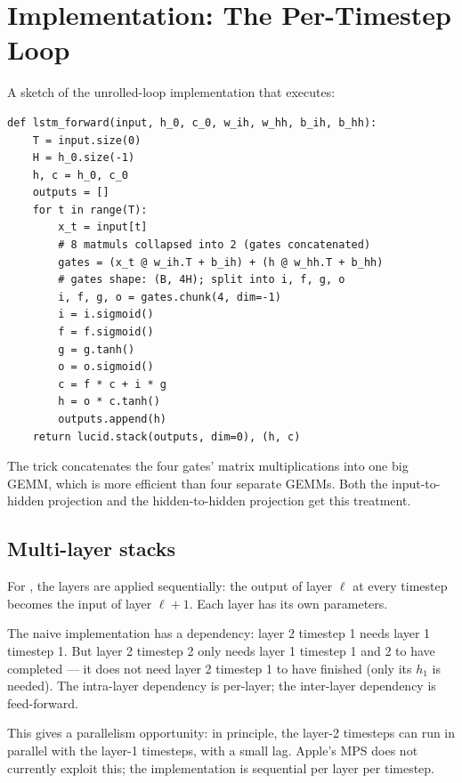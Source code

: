 \section{Implementation: The Per-Timestep Loop}
\label{sec:rnn_family:per_timestep}

A sketch of the unrolled-loop implementation that
 executes:

\begin{lstlisting}[style=lucid,language=LucidPython]
def lstm_forward(input, h_0, c_0, w_ih, w_hh, b_ih, b_hh):
    T = input.size(0)
    H = h_0.size(-1)
    h, c = h_0, c_0
    outputs = []
    for t in range(T):
        x_t = input[t]
        # 8 matmuls collapsed into 2 (gates concatenated)
        gates = (x_t @ w_ih.T + b_ih) + (h @ w_hh.T + b_hh)
        # gates shape: (B, 4H); split into i, f, g, o
        i, f, g, o = gates.chunk(4, dim=-1)
        i = i.sigmoid()
        f = f.sigmoid()
        g = g.tanh()
        o = o.sigmoid()
        c = f * c + i * g
        h = o * c.tanh()
        outputs.append(h)
    return lucid.stack(outputs, dim=0), (h, c)
\end{lstlisting}

The trick  concatenates the four gates'
matrix multiplications into one big GEMM, which is more
efficient than four separate GEMMs. Both the input-to-hidden
projection and the hidden-to-hidden projection get this
treatment.

\subsection{Multi-layer stacks}
\label{ssec:rnn_family:multi_layer}

For , the layers are applied sequentially:
the output of layer $\ell$ at every timestep becomes the input
of layer $\ell + 1$. Each layer has its own parameters.

The naive implementation has a dependency: layer 2 timestep 1
needs layer 1 timestep 1. But layer 2 timestep 2 only needs
layer 1 timestep 1 and 2 to have completed --- it does not
need layer 2 timestep 1 to have finished (only its $h_1$ is
needed). The intra-layer dependency is per-layer; the
inter-layer dependency is feed-forward.

This gives a parallelism opportunity: in principle, the
layer-2 timesteps can run in parallel with the layer-1
timesteps, with a small lag. Apple's MPS does not currently
exploit this; the implementation is sequential per layer per
timestep.

